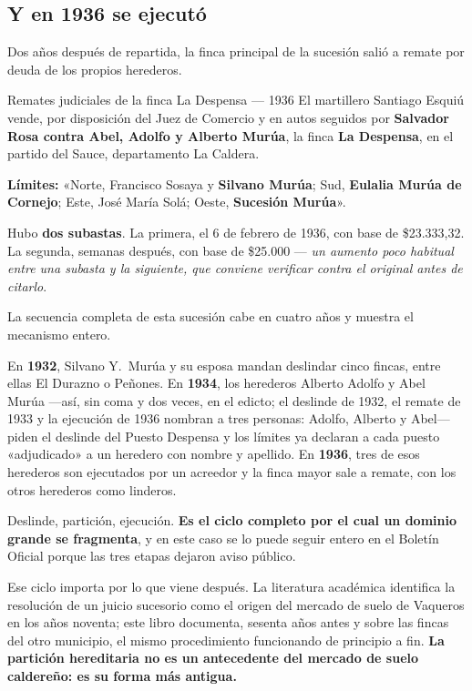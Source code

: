 \subsection*{Y en 1936 se ejecutó}

Dos años después de repartida, la finca principal de la sucesión salió a remate por deuda de
los propios herederos.

\begin{ficha}{Remates judiciales de la finca La Despensa --- 1936}
El martillero Santiago Esquiú vende, por disposición del Juez de Comercio y en autos
seguidos por \textbf{Salvador Rosa contra Abel, Adolfo y Alberto Murúa}, la finca \textbf{La
Despensa}, en el partido del Sauce, departamento La Caldera.

\textbf{Límites:} «Norte, Francisco Sosaya y \textbf{Silvano Murúa}; Sud, \textbf{Eulalia
Murúa de Cornejo}; Este, José María Solá; Oeste, \textbf{Sucesión Murúa}».

Hubo \textbf{dos subastas}. La primera, el 6 de febrero de 1936, con base de \$23.333,32. La
segunda, semanas después, con base de \$25.000 --- \textit{un aumento poco habitual entre
una subasta y la siguiente, que conviene verificar contra el original antes de citarlo}.
\end{ficha}

La secuencia completa de esta sucesión cabe en cuatro años y muestra el mecanismo entero.

En \textbf{1932}, Silvano Y.\ Murúa y su esposa mandan deslindar cinco fincas, entre ellas
El Durazno o Peñones. En \textbf{1934}, los herederos Alberto Adolfo y Abel Murúa ---así, sin coma y dos veces, en el edicto; el deslinde de 1932, el remate de 1933 y la ejecución de 1936 nombran a tres personas: Adolfo, Alberto y Abel--- piden el deslinde del Puesto
Despensa y los límites ya declaran a cada puesto «adjudicado» a un heredero con nombre y
apellido. En \textbf{1936}, tres de esos herederos son ejecutados por un acreedor y la finca
mayor sale a remate, con los otros herederos como linderos.

Deslinde, partición, ejecución. \textbf{Es el ciclo completo por el cual un dominio grande se
fragmenta}, y en este caso se lo puede seguir entero en el Boletín Oficial porque las tres
etapas dejaron aviso público.

Ese ciclo importa por lo que viene después. La literatura académica identifica la resolución
de un juicio sucesorio como el origen del mercado de suelo de Vaqueros en los años noventa;
este libro documenta, sesenta años antes y sobre las fincas del otro municipio, el mismo
procedimiento funcionando de principio a fin. \textbf{La partición hereditaria no es un
antecedente del mercado de suelo caldereño: es su forma más antigua.}

